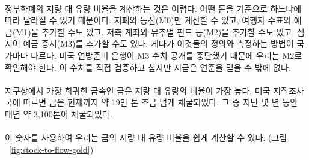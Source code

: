 \paragraph{}
\begin{comment}	
	Calculating the stock-to-flow ratio for fiat currency is difficult, because how
	much money there is depends on how you look at it.~\cite{wiki:money-supply} You
	could count only banknotes and coins (M0), add traveler checks and check
	deposits (M1), add saving accounts and mutual funds and some other things (M2),
	and even add certificates of deposit to all of that (M3). Further, how all of
	this is defined and measured varies from country to country and since the US
	Federal Reserve stopped publishing \cite{web:fed-m3} numbers for M3, we will
	have to make do with the M2 monetary supply. I would love to verify these
	numbers, but I guess we have to trust the fed for now.
\end{comment}
정부화폐의 저량 대 유량 비율을 계산하는 것은 어렵다. 
어떤 돈을 기준으로 하느냐에 따라 달라질 수 있기 때문이다\cite{wiki:money-supply}.
지폐와 동전(M0)만 계산할 수 있고, 여행자 수표와 예금(M1)을 추가할 수도 있고, 
저축 계좌와 뮤추얼 펀드 등(M2)을 추가할 수도 있고, 심지어 예금 증서(M3)를 추가할 수도 있다.
게다가 이것들의 정의와 측정하는 방법이 국가마다 다르다.
미국 연방준비 은행이 M3 수치 공개를 중단했기 때문에 우리는 M2로 확인해야 한다.\cite{web:fed-m3}
이 수치를 직접 검증하고 싶지만 지금은 연준을 믿을 수 밖에 없다.

\paragraph{}
\begin{comment}	
	Gold, one of the rarest metals on earth, has the highest stock-to-flow
	ratio. According to the US Geological Survey, a little more than 190,000
	tons have been mined. In the last few years, around 3100 tons of gold
	have been mined per year.~\cite{mineral-commodity-summaries}
\end{comment}
지구상에서 가장 희귀한 금속인 금은 저량 대 유량의 비율이 가장 높다.
미국 지질조사국에 따르면 금은 현재까지 약 19만 톤 조금 넘게 채굴되었다.
그 중 지난 몇 년 동안 매년 약 3,100톤이 채굴되었다.~\cite{mineral-commodity-summaries}

\paragraph{}
\begin{comment}	
	Using these numbers, we can easily calculate the stock-to-flow ratio for
	gold (see Figure~\ref{fig:stock-to-flow-gold}).
\end{comment}
이 숫자를 사용하여 우리는 금의 저량 대 유량 비율을 쉽게 계산할 수 있다. (그림 ~\ref{fig:stock-to-flow-gold})

